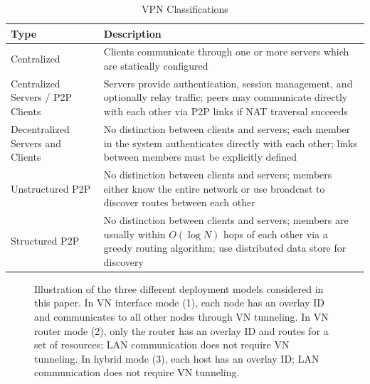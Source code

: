 \begin{table}[ht]
\caption{VPN Classifications}
\label{tab:vpn_types}
\begin{center}
\begin{tabular}{|p{1.5in}|p{4.5in}|} \hline
Type & Description \\ \hline
Centralized & Clients communicate through one or more servers which are statically
configured \\ \hline
Centralized Servers / P2P Clients & Servers provide authentication, session management, and
optionally relay traffic; peers may communicate directly with each
other via P2P links if NAT traversal succeeds\\ \hline
Decentralized Servers and Clients & No distinction between clients and servers;
each member in the system authenticates directly with each other; links between
members must be explicitly defined \\ \hline
Unstructured P2P & No distinction between clients and servers; members either know
the entire network or use broadcast to discover routes between each other \\ \hline
Structured P2P & No distinction between clients and servers; members are usually
within $O(\log N)$ hops of each other via a greedy routing algorithm; use
distributed data store for discovery \\ \hline
\end{tabular}
\end{center}
\end{table}

\clearpage

\begin{figure}[ht]
\centering
{}
\caption[Three VN Approaches]{Illustration of the three different deployment
models considered in this paper. In VN interface mode (1), each node has an
overlay ID and communicates to all other nodes through VN tunneling. In VN
router mode (2), only the router has an overlay ID and routes for a set of
resources; LAN communication does not require VN tunneling. In hybrid mode
(3), each host has an overlay ID; LAN communication does not require VN
tunneling.}
\label{fig:three_models}
\end{figure}

